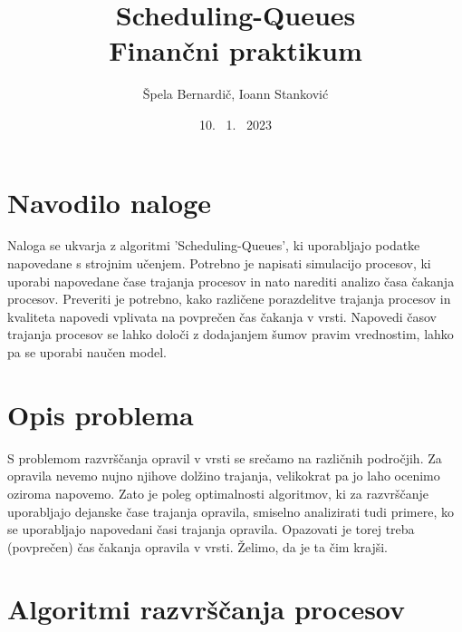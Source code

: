 \documentclass[a4paper, pt14]{article}
\begin{document}
\title{%
Scheduling-Queues\\
  \large Finančni praktikum}
\author{Špela Bernardič, Ioann Stanković}
\date{10. \ 1. \ 2023}

\maketitle






\section{Navodilo naloge}
Naloga se ukvarja z algoritmi 'Scheduling-Queues', ki uporabljajo podatke napovedane s strojnim učenjem.
Potrebno je napisati simulacijo procesov, ki uporabi napovedane čase trajanja procesov in nato narediti analizo časa čakanja procesov.
Preveriti je potrebno, kako različene porazdelitve trajanja procesov in kvaliteta napovedi vplivata na povprečen čas čakanja v vrsti.
Napovedi časov trajanja procesov se lahko določi z dodajanjem šumov pravim vrednostim, lahko pa se uporabi naučen model.


\section{Opis problema}

S problemom razvrščanja opravil v vrsti se srečamo na različnih področjih. Za opravila nevemo nujno njihove dolžino trajanja, velikokrat pa jo laho ocenimo oziroma napovemo. 
Zato je poleg optimalnosti algoritmov, ki za razvrščanje uporabljajo dejanske čase trajanja opravila, smiselno analizirati tudi primere, ko se uporabljajo napovedani časi trajanja opravila.
Opazovati je torej treba (povprečen) čas čakanja opravila v vrsti. Želimo, da je ta čim krajši.

\section{Algoritmi razvrščanja procesov}
\end{document}
